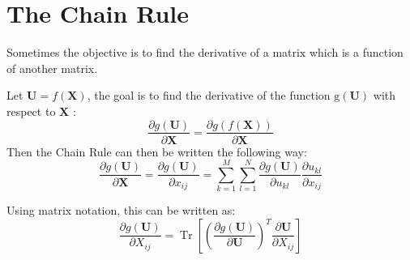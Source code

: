 \section{The Chain Rule}

Sometimes the objective is to find the derivative of a matrix which is a function of another matrix. 

\begin{theorem}
    Let $ \mathbf{U}=f(\mathbf{X}) $, the goal is to find the derivative of the function $ \mathrm{g}(\mathbf{U}) $ with respect to $ \mathbf{X} $ :
$$
\frac{\partial g(\mathbf{U})}{\partial \mathbf{X}}=\frac{\partial g(f(\mathbf{X}))}{\partial \mathbf{X}}
$$
Then the Chain Rule can then be written the following way:
$$
\frac{\partial g(\mathbf{U})}{\partial \mathbf{X}}=\frac{\partial g(\mathbf{U})}{\partial x_{i j}}=\sum_{k=1}^{M} \sum_{l=1}^{N} \frac{\partial g(\mathbf{U})}{\partial u_{k l}} \frac{\partial u_{k l}}{\partial x_{i j}}
$$
\end{theorem}

\begin{corollary}
    Using matrix notation, this can be written as:
$$
\frac{\partial g(\mathbf{U})}{\partial X_{i j}}=\operatorname{Tr}\left[\left(\frac{\partial g(\mathbf{U})}{\partial \mathbf{U}}\right)^{T} \frac{\partial \mathbf{U}}{\partial X_{i j}}\right]
$$
\end{corollary}

